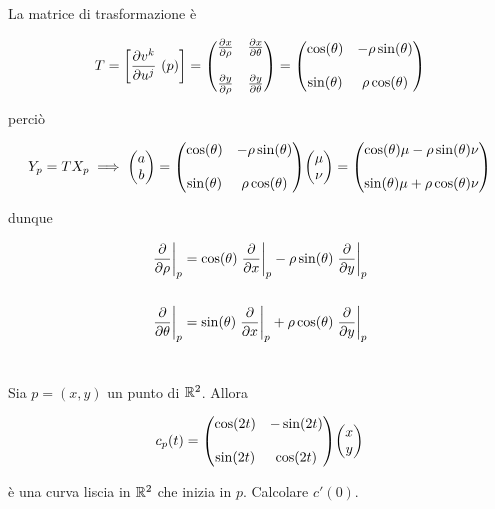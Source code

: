 La matrice di trasformazione è

\begin{equation}
	T = \left[ \pdv{v^{k}}{u^{j}}\ (p) \right] = \mqty( \pdv{x}{\rho} & \pdv{x}{\theta} \\\\ \pdv{y}{\rho} & \pdv{y}{\theta} ) %
	= \mqty( \cos(\theta) & - \rho \sin(\theta) \\\\ \sin(\theta) & \rho \cos(\theta) )
\end{equation}

perciò

\begin{equation}
	Y_{p} = T X_{p} %
	\implies %
	\mqty( a \\ b ) = \mqty( \cos(\theta) & - \rho \sin(\theta) \\\\ \sin(\theta) & \rho \cos(\theta) ) \mqty( \mu \\ \nu ) = \mqty( \cos(\theta) \mu - \rho \sin(\theta) \nu \\\\ \sin(\theta) \mu + \rho \cos(\theta) \nu )
\end{equation}

dunque

\begin{align}
	\begin{split}
		\eval{\pdv{\rho}}_{p} &= \cos(\theta) \eval{\pdv{x}}_{p} - \rho \sin(\theta) \eval{\pdv{y}}_{p}\\\\
		\eval{\pdv{\theta}}_{p} &= \sin(\theta) \eval{\pdv{x}}_{p} + \rho \cos(\theta) \eval{\pdv{y}}_{p}
	\end{split}
\end{align}

\tocless\section{}\label{es2-10}

\begin{tcolorbox}
	Sia $ p = (x,y) $ un punto di $ \mathbb{R}^{2} $. Allora
	
	\begin{equation}
		c_{p}(t) = \mqty( \cos(2t) & -\sin(2t) \\\\ \sin(2t) & \cos(2t) ) \mqty(x \\ y)
	\end{equation}
	
	è una curva liscia in $ \mathbb{R}^{2} $ che inizia in $ p $. Calcolare $ c'(0) $.
\end{tcolorbox}

